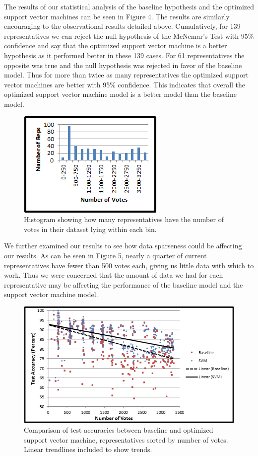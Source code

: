 \documentclass[11pt,letterpaper,twocolumn]{article}
\begin{document}
The results of our statistical analysis of the baseline hypothesis and the optimized support vector machines can be seen in Figure 4. The results are similarly encouraging to the observational results detailed above. Cumulatively, for 139 representatives we can reject the null hypothesis of the McNemar's Test with 95\% confidence and say that the optimized support vector machine is a better hypothesis as it performed better in these 139 cases. For 61 representatives the opposite was true and the null hypothesis was rejected in favor of the baseline model. Thus for more than twice as many representatives the optimized support vector machines are better with 95\% confidence. This indicates that overall the optimized support vector machine model is a better model than the baseline model.

\begin{figure}
\centering
\includegraphics{data_distribution2.png}
\caption{Histogram showing how many representatives have the number of votes in their dataset lying within each bin.}
\end{figure}

We further examined our results to see how data sparseness could be affecting our results. As can be seen in Figure 5, nearly a quarter of current representatives have fewer than 500 votes each, giving us little data with which to work. Thus we were concerned that the amount of data we had for each representative may be affecting the performance of the baseline model and the support vector machine model.

\begin{figure}[t]
\centering
\includegraphics{size_accuracy2.png}
\caption{Comparison of test accuracies between baseline and optimized support vector machine, representatives sorted by number of votes. Linear trendlines included to show trends.}
\end{figure}
\end{document}
